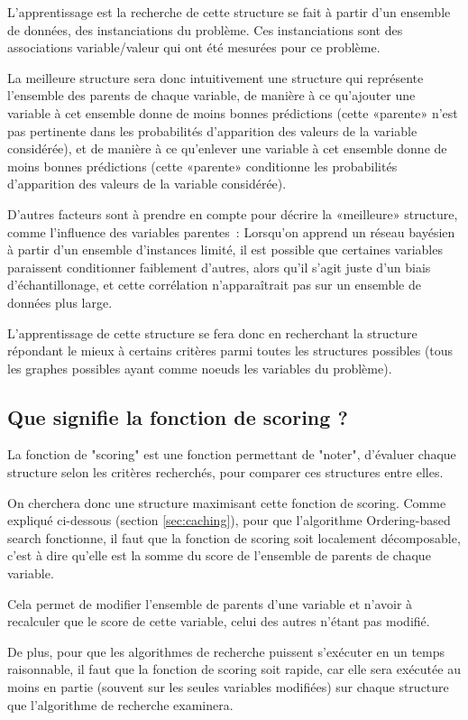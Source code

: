 \documentclass[french,a4paper]{article}
\begin{document}
L'apprentissage est la recherche de cette structure se fait à partir
d'un ensemble de données, des instanciations du problème. Ces
instanciations sont des associations variable/valeur qui ont été
mesurées pour ce problème.

La meilleure structure sera donc intuitivement une structure qui
représente l'ensemble des parents de chaque variable, de manière à ce
qu'ajouter une variable à cet ensemble donne de moins bonnes
prédictions (cette «parente» n'est pas pertinente dans les
probabilités d'apparition des valeurs de la variable considérée), et
de manière à ce qu'enlever une variable à cet ensemble donne de moins
bonnes prédictions (cette «parente» conditionne les probabilités
d'apparition des valeurs de la variable considérée).

D'autres facteurs sont à prendre en compte pour décrire la «meilleure»
structure, comme l'influence des variables parentes~: Lorsqu'on
apprend un réseau bayésien à partir d'un ensemble d'instances limité,
il est possible que certaines variables paraissent conditionner
faiblement d'autres, alors qu'il s'agit juste d'un biais
d'échantillonage, et cette corrélation n'apparaîtrait pas sur un
ensemble de données plus large.

L'apprentissage de cette structure se fera donc en recherchant la
structure répondant le mieux à certains critères parmi toutes les
structures possibles (tous les graphes possibles ayant comme noeuds
les variables du problème).

\subsection{Que signifie la fonction de scoring ?}

La fonction de "scoring" est une fonction permettant de "noter",
d'évaluer chaque structure selon les critères recherchés, pour
comparer ces structures entre elles.

On cherchera donc une structure maximisant cette fonction de
scoring. Comme expliqué ci-dessous (section \ref{sec:caching}), pour
que l'algorithme Ordering-based search fonctionne, il faut que la
fonction de scoring soit localement décomposable, c'est à dire qu'elle
est la somme du score de l'ensemble de parents de chaque variable.

Cela permet de modifier l'ensemble de parents d'une variable et
n'avoir à recalculer que le score de cette variable, celui des autres
n'étant pas modifié.

De plus, pour que les algorithmes de recherche puissent s'exécuter en
un temps raisonnable, il faut que la fonction de scoring soit rapide,
car elle sera exécutée au moins en partie (souvent sur les seules
variables modifiées) sur chaque structure que l'algorithme de
recherche examinera.
\end{document}
